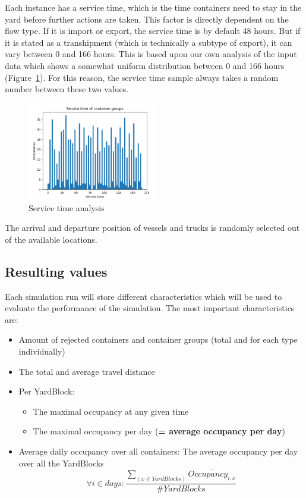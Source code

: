 \documentclass[]{article}
\begin{document}
Each instance has a service time, which is the time containers need to stay in
the yard before further actions are taken. This factor is directly dependent on
the flow type. If it is import or export, the service time is by default 48
hours. But if it is stated as a transhipment (which is technically a subtype of
export), it can vary between 0 and 166 hours. This is based upon our own
analysis of the input data which shows a somewhat uniform distribution between
0 and 166 hours (Figure~\ref{fig: service time analysis}). For this reason, the
service time sample always takes a random number between these two values.
\begin{figure}
	\centering
	\includegraphics[width=0.5\textwidth]{Afbeeldingen/service time analysis.png}
	\caption{Service time analysis}
	\label{fig: service time analysis}
\end{figure}

The arrival and departure position of vessels and trucks is randomly selected
out of the available locations.

\subsection{Resulting values}
Each simulation run will store different characteristics which will be used to
evaluate the performance of the simulation. The most important characteristics
are: \begin{itemize}
	\item Amount of rejected containers and container groups (total and for each type
	      individually)
	\item The total and average travel distance
	\item Per YardBlock:
	      \begin{itemize}
		      \item The maximal occupancy at any given time
		      \item The maximal occupancy per day (\textbf{= average occupancy per day})
	      \end{itemize}
	\item Average daily occupancy over all containers: The average occupancy per day over
	      all the YardBlocks \[\forall i \in days: \frac{\sum_{(x \in YardBlocks)}
			      \overline{Occupancy_{i,x}}}{\#YardBlocks}\]
\end{itemize}
\end{document}
